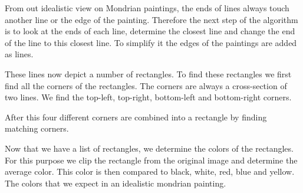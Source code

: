 From out idealistic view on Mondrian paintings, the ends of lines always touch
another line or the edge of the painting. Therefore the next step of the
algorithm is to look at the ends of each line, determine the closest line and
change the end of the line to this closest line. To simplify it the edges of the
paintings are added as lines.

These lines now depict a number of rectangles. To find these rectangles we first
find all the corners of the rectangles. The corners are always a cross-section
of two lines. We find the top-left, top-right, bottom-left and bottom-right
corners.

After this four different corners are combined into a rectangle by finding
matching corners.

Now that we have a list of rectangles, we determine the colors of the
rectangles. For this purpose we clip the rectangle from the original image and
determine the average color. This color is then compared to black, white, red,
blue and yellow. The colors that we expect in an idealistic mondrian painting.

